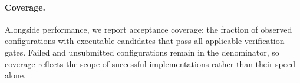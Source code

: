 \paragraph{Coverage.}
Alongside performance, we report acceptance coverage: the fraction of observed configurations with executable candidates that pass all applicable verification gates. Failed and unsubmitted configurations remain in the denominator, so coverage reflects the scope of successful implementations rather than their speed alone.












